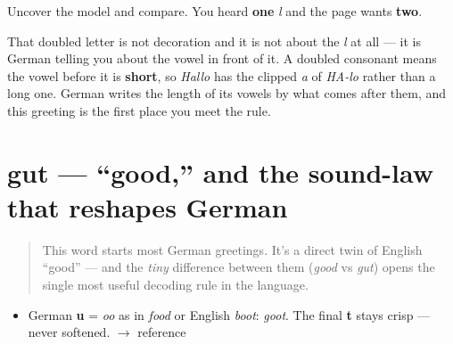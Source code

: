 \begin{tcolorbox}[breakable,colback=teal!4,colframe=teal!35!black,title={Before you move on}]
Uncover the model and compare. You heard \textbf{one} \emph{l} and the page wants \textbf{two}.

That doubled letter is not decoration and it is not about the \emph{l} at all — it is German telling you about the vowel in front of it. A doubled consonant means the vowel before it is \textbf{short}, so \emph{Hallo} has the clipped \emph{a} of \emph{HA-lo} rather than a long one. German writes the length of its vowels by what comes after them, and this greeting is the first place you meet the rule.
\end{tcolorbox}
\section[gut]{gut — \textquotedblleft{}good,\textquotedblright{} and the sound-law that reshapes German}

\label{lesson:GE-C01-gut}



\begin{quote}
This word starts most German greetings. It's a direct twin of English \textquotedblleft{}good\textquotedblright{} — and the \emph{tiny} difference between them (\emph{good} vs \emph{gut}) opens the single most useful decoding rule in the language.
\end{quote}

\begin{sounds}
\begin{itemize}
\raggedright
  \item German \textbf{u} = \emph{oo} as in \emph{food} or English \emph{boot}: \emph{goot}. The final \textbf{t} stays crisp — never softened. $\to$ reference
\end{itemize}
\end{sounds}

